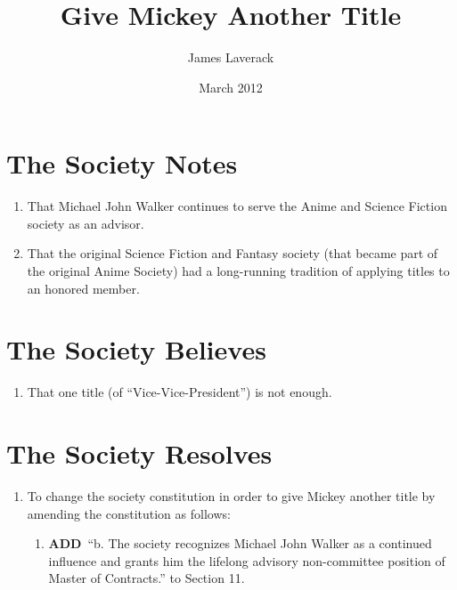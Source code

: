 \documentclass[a4paper,10pt]{article}
\title{Give Mickey Another Title}
\author{James Laverack}
\date{March 2012}
\newcommand{\add}{\textbf{ADD}\ }
\begin{document}
\maketitle

\section*{The Society Notes}
\begin{enumerate}
  \item That Michael John Walker continues to serve the Anime and Science Fiction society as an advisor.
  \item That the original Science Fiction and Fantasy society (that became part of the original Anime Society) had a long-running tradition of applying titles to an honored member.
\end{enumerate}

\section*{The Society Believes}
\begin{enumerate}
  \item That one title (of ``Vice-Vice-President'') is not enough.
\end{enumerate}

\section*{The Society Resolves}
\begin{enumerate}
  \item To change the society constitution in order to give Mickey another title by amending the constitution as follows:
  \begin{enumerate}
    \item \add ``b. The society recognizes Michael John Walker as a continued influence and grants him the lifelong advisory non-committee position of Master of Contracts.'' to Section 11.
  \end{enumerate}
\end{enumerate}
\end{document}
